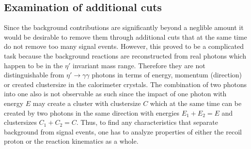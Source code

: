 \subsection{Examination of additional cuts}
\label{subsec:addcuts}
Since the background contributions are significantly beyond a neglible amount it would be desirable to remove them through additional cuts that at the same time do not remove too many signal events. However, this proved to be a complicated task because the background reactions are reconstructed from real photons which happen to be in the $\eta'$ invariant mass range. Therefore they are not distinguishable from $\eta'\to\gamma\gamma$ photons in terms of energy, momentum (direction) or created clustersize in the calorimeter crystals. The combination of two photons into one also is not observable as such since the impact of one photon with energy $E$ may create a cluster with clustersize $C$ which at the same time can be created by two photons in the same direction with energies $E_1+E_2=E$ and clustersizes $C_1+C_2=C$. Thus, to find any characteristics that separate background from signal events, one has to analyze properties of either the recoil proton or the reaction kinematics as a whole.

